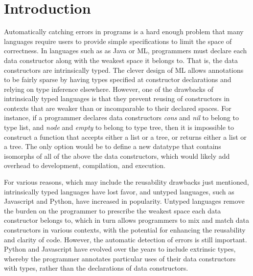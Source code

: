 \documentclass[acmsmall]{acmart}
\theoremstyle{definition}
\begin{document}
 
     


\newcommand{\tl}{\textasciitilde{}}
\newcommand{\typdiff}{\J{\textbackslash}}

\maketitle


\section{Introduction}
\label{sec:introduction}

Automatically catching errors in programs is a hard enough problem
that many languages require users to provide simple specifications to limit the space of correctness.
In languages such as as Java or ML, programmers must declare each data constructor along with the weakest space it belongs to. 
That is, the data constructors are intrinsically typed.
The clever design of ML allows annotations to be fairly sparse by 
having types specified at constructor declarations and relying on type inference elsewhere.
However, one of the drawbacks of intrinsically typed languages is that they prevent reusing of
constructors in contexts that are weaker than or incomparable to their declared spaces. 
For instance, if a programmer declares data constructors \emph{cons} and \emph{nil} to belong to type list,
and \emph{node} and \emph{empty} to belong to type tree, then it is impossible to construct a function
that accepts either a list or a tree, or returns either a list or a tree. The only option would be to define
a new datatype that contains isomorphs of all of the above the data constructors, which would 
likely add overhead to development, compilation, and execution.


For various reasons, which may include the reusability drawbacks just mentioned, 
intrinsically typed languages have lost favor,
and untyped languages, 
such as Javascript and Python, have increased in popularity. 
Untyped languages remove the burden on the programmer to prescribe the weakest space each data constructor belongs to, 
which in turn allows programmers to mix and match data constructors in
various contexts, with the potential for enhancing the reusability and clarity of code.
However, the automatic detection of errors is still important. Python and Javascript have 
evolved over the years to include extrinsic types, whereby the programmer annotates particular uses of
their data constructors with types, rather than the declarations of data constructors.
 
\end{document}
